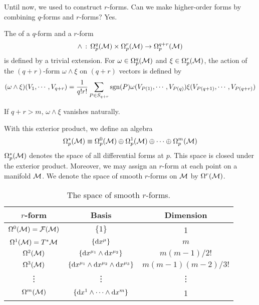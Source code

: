 \documentclass[a4paper, 10pt]{article}
\begin{document}
Until now, we used  to construct $r$-forms. Can we make higher-order forms by combining $q$-forms and $r$-forms? Yes.
\begin{definition}
    The  of a $q$-form and a $r$-form
    \[ \wedge \,:\, \Omega_{p}^{q}(\mathcal{M}) \times \Omega_{p}^{r}(\mathcal{M}) \rightarrow \Omega_{p}^{q+r}(\mathcal{M}) \]
    is defined by a trivial extension. For $\omega \in \Omega_{p}^{q}(\mathcal{M})$ and $\xi \in \Omega_{p}^{r}(\mathcal{M})$, the action of the $(q+r)$-form $\omega\wedge\xi$ on $(q+r)$ vectors is defined by
    \[ (\omega\wedge\xi)(V_{1},\cdots,V_{q+r}) = \frac{1}{q!r!}\sum_{P \in S_{q+r}} \mathrm{sgn}(P)\omega(V_{P(1)},\cdots,V_{P(q)})\xi(V_{P(q+1)},\cdots,V_{P(q+r)}) \]
\end{definition}

\begin{remark}
    If $q+r > m$, $\omega\wedge\xi$ vanishes naturally.
\end{remark}
\begin{remark}
    With this exterior product, we define an algebra
    \[ \Omega_{p}^{\ast}(\mathcal{M}) \equiv \Omega_{p}^{0}(\mathcal{M}) \oplus \Omega_{p}^{1}(\mathcal{M}) \oplus \cdots \oplus \Omega_{p}^{m}(\mathcal{M}) \]
    $\Omega_{p}^{\ast}(\mathcal{M})$ denotes the space of all differential forms at $p$. This space is closed under the exterior product. Moreover, we may assign an $r$-form  at each point on a manifold $\mathcal{M}$. We denote the space of smooth $r$-forms on $\mathcal{M}$ by $\Omega^{r}(\mathcal{M})$.
\end{remark}

\begin{table}[htbp]
    \begin{center}
        \begin{tabular}{ccc}
            \hline
            $r$-form & Basis & Dimension \\
            \hline
            $\Omega^{0}(\mathcal{M}) = \mathcal{F}(\mathcal{M})$ & $\{1\}$ & 1 \\
            $\Omega^{1}(\mathcal{M}) = T^{\ast}\mathcal{M}$ & $\{\mathrm{d}{x}^{\mu}\}$ & $m$ \\
            $\Omega^{2}(\mathcal{M})$ & $\{\mathrm{d}{x}^{\mu_{1}}\wedge\mathrm{d}{x}^{\mu_{2}}\}$ & $m(m-1)/2!$ \\
            $\Omega^{3}(\mathcal{M})$ & $\{\mathrm{d}{x}^{\mu_{1}}\wedge\mathrm{d}{x}^{\mu_{2}}\wedge\mathrm{d}{x}^{\mu_{3}}\}$ & $m(m-1)(m-2)/3!$ \\
            \vdots & \vdots & \vdots \\
            $\Omega^{m}(\mathcal{M})$ & $\{\mathrm{d}{x}^{1}\wedge\cdots\wedge\mathrm{d}{x}^{m}\}$ & 1 \\
            \hline
        \end{tabular}
        \caption{The space of smooth $r$-forms.}
    \end{center}
\end{table}
\newpage
\end{document}
